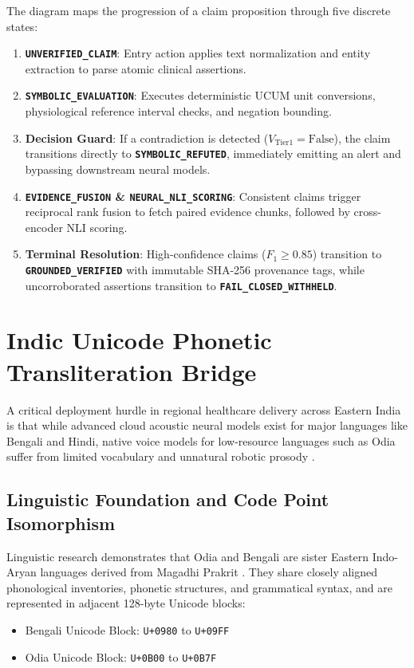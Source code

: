 The diagram maps the progression of a claim proposition through five discrete states:
\begin{enumerate}
    \item \textbf{\texttt{UNVERIFIED\_CLAIM}}: Entry action applies text normalization and entity extraction to parse atomic clinical assertions.
    \item \textbf{\texttt{SYMBOLIC\_EVALUATION}}: Executes deterministic UCUM unit conversions, physiological reference interval checks, and negation bounding.
    \item \textbf{Decision Guard}: If a contradiction is detected ($V_{\text{Tier1}} = \text{False}$), the claim transitions directly to \textbf{\texttt{SYMBOLIC\_REFUTED}}, immediately emitting an alert and bypassing downstream neural models.
    \item \textbf{\texttt{EVIDENCE\_FUSION} \& \texttt{NEURAL\_NLI\_SCORING}}: Consistent claims trigger reciprocal rank fusion to fetch paired evidence chunks, followed by cross-encoder NLI scoring.
    \item \textbf{Terminal Resolution}: High-confidence claims ($F_1 \ge 0.85$) transition to \textbf{\texttt{GROUNDED\_VERIFIED}} with immutable SHA-256 provenance tags, while uncorroborated assertions transition to \textbf{\texttt{FAIL\_CLOSED\_WITHHELD}}.
\end{enumerate}


\section{Indic Unicode Phonetic Transliteration Bridge}
\label{sec:indic_voice_bridge}

A critical deployment hurdle in regional healthcare delivery across Eastern India is that while advanced cloud acoustic neural models exist for major languages like Bengali and Hindi, native voice models for low-resource languages such as Odia suffer from limited vocabulary and unnatural robotic prosody \cite{microsoft2024edgetts}.

\subsection{Linguistic Foundation and Code Point Isomorphism}
Linguistic research demonstrates that Odia and Bengali are sister Eastern Indo-Aryan languages derived from Magadhi Prakrit \cite{kumar2023linguistic}. They share closely aligned phonological inventories, phonetic structures, and grammatical syntax, and are represented in adjacent 128-byte Unicode blocks:
\begin{itemize}
  \item Bengali Unicode Block: \texttt{U+0980} to \texttt{U+09FF}
  \item Odia Unicode Block: \texttt{U+0B00} to \texttt{U+0B7F}
\end{itemize}

